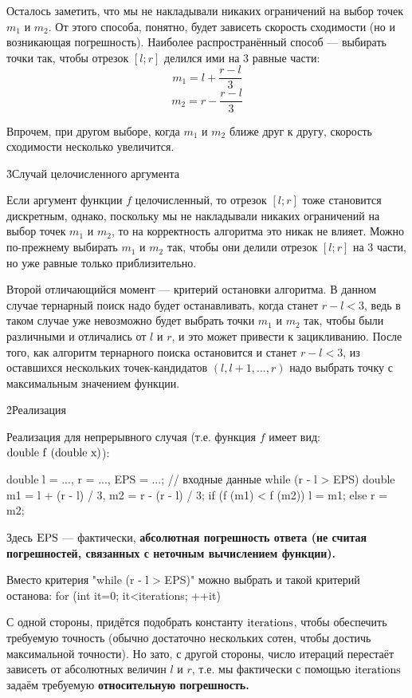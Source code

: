 Осталось заметить, что мы не накладывали никаких ограничений на выбор точек $m_1$ и $m_2$. От этого способа, понятно, будет зависеть скорость сходимости (но и возникающая погрешность). Наиболее распространённый способ --- выбирать точки так, чтобы отрезок $[l;r]$ делился ими на 3 равные части:
$$ m_1 = l + \frac{r-l}{3} $$
$$ m_2 = r - \frac{r-l}{3} $$

Впрочем, при другом выборе, когда $m_1$ и $m_2$ ближе друг к другу, скорость сходимости несколько увеличится.

\h3{Случай целочисленного аргумента}

Если аргумент функции $f$ целочисленный, то отрезок $[l;r]$ тоже становится дискретным, однако, поскольку мы не накладывали никаких ограничений на выбор точек $m_1$ и $m_2$, то на корректность алгоритма это никак не влияет. Можно по-прежнему выбирать $m_1$ и $m_2$ так, чтобы они делили отрезок $[l;r]$ на 3 части, но уже равные только приблизительно.

Второй отличающийся момент --- критерий остановки алгоритма. В данном случае тернарный поиск надо будет останавливать, когда станет $r-l<3$, ведь в таком случае уже невозможно будет выбрать точки $m_1$ и $m_2$ так, чтобы были различными и отличались от $l$ и $r$, и это может привести к зацикливанию. После того, как алгоритм тернарного поиска остановится и станет $r-l<3$, из оставшихся нескольких точек-кандидатов $(l,l+1,\ldots,r)$ надо выбрать точку с максимальным значением функции.

\h2{Реализация}

Реализация для непрерывного случая (т.е. функция $f$ имеет вид: $\rm double\ f\ (double\ x)$):

\code
double l = ..., r = ..., EPS = ...; // входные данные
while (r - l > EPS) {
   double m1 = l + (r - l) / 3,
      m2 = r - (r - l) / 3;
   if (f (m1) < f (m2))
      l = m1;
   else
      r = m2;
}
\endcode

Здесь $\rm EPS$ --- фактически, \bf{абсолютная погрешность} ответа (не считая погрешностей, связанных с неточным вычислением функции).

Вместо критерия "while (r - l > EPS)" можно выбрать и такой критерий останова:
\code
for (int it=0; it<iterations; ++it)
\endcode

С одной стороны, придётся подобрать константу $\rm iterations$, чтобы обеспечить требуемую точность (обычно достаточно нескольких сотен, чтобы достичь максимальной точности). Но зато, с другой стороны, число итераций перестаёт зависеть от абсолютных величин $l$ и $r$, т.е. мы фактически с помощью $\rm iterations$ задаём требуемую \bf{относительную погрешность}.